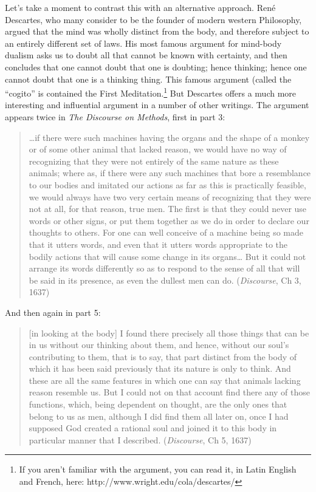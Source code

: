 Let's take a moment to contrast this with an alternative approach. René Descartes, who many consider to be the founder of modern western Philosophy, argued that the mind was wholly distinct from the body, and therefore subject to an entirely different set of laws. His most famous argument for mind-body dualism asks us to doubt all that cannot be known with certainty, and then concludes that one cannot doubt that one is doubting; hence thinking; hence one cannot doubt that one is a thinking thing. This famous argument (called the ``cogito'' is contained the First Meditation.\footnote{If you aren't familiar with the argument, you can read it, in Latin English and French, here: http:\slash \slash www.wright.edu\slash cola\slash descartes\slash } But Descartes offers a much more interesting and influential argument in a number of other writings. The argument appears twice in \emph{The Discourse on Methods}, first in part 3:

\begin{quote}

{\ldots}if there were such machines having the organs and the shape of a monkey or of some other animal that lacked reason, we would have no way of recognizing that they were not entirely of the same nature as these animals; where as, if there were any such machines that bore a resemblance to our bodies and imitated our actions as far as this is practically feasible, we would always have two very certain means of recognizing that they were not at all, for that reason, true men. The first is that they could never use words or other signs, or put them together as we do in order to declare our thoughts to others. For one can well conceive of a machine being so made that it utters words, and even that it utters words appropriate to the bodily actions that will cause some change in its organs{\ldots} But it could not arrange its words differently so as to respond to the sense of all that will be said in its presence, as even the dullest men can do. (\emph{Discourse}, Ch 3, 1637)
\end{quote}

And then again in part 5:

\begin{quote}

[in looking at the body] I found there precisely all those things that can be in us without our thinking about them, and hence, without our soul's contributing to them, that is to say, that part distinct from the body of which it has been said previously that its nature is only to think. And these are all the same features in which one can say that animals lacking reason resemble us. But I could not on that account find there any of those functions, which, being dependent on thought, are the only ones that belong to us as men, although I did find them all later on, once I had supposed God created a rational soul and joined it to this body in particular manner that I described. (\emph{Discourse}, Ch 5, 1637)
\end{quote}

